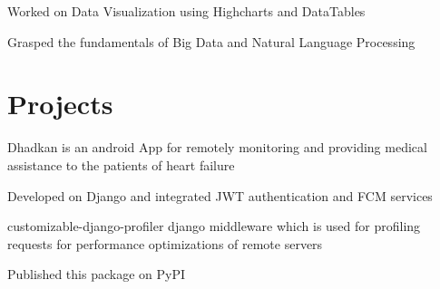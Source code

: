 \documentclass[]{deedy-resume-openfont}
\begin{document}
\begin{minipage}[t]{0.66\textwidth}
\begin{tightemize}
\item Worked on Data Visualization using Highcharts and DataTables
\item Grasped the fundamentals of Big Data and Natural Language Processing
\end{tightemize}
\sectionsep




\section{Projects}
\begin{tightemize}
\item Dhadkan is an android App for remotely monitoring and providing medical assistance to the patients of heart failure
\item Developed on Django and integrated JWT authentication and FCM services
\end{tightemize}
\sectionsep


\begin{tightemize}
\item customizable-django-profiler django middleware which is used for profiling requests for performance optimizations of remote servers
\item Published this package on PyPI
\end{tightemize}
\sectionsep



\end{minipage}
\end{document}
